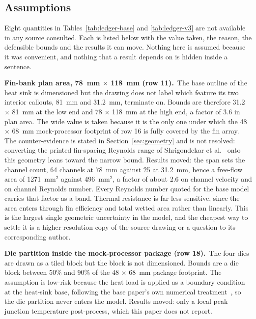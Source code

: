 \subsection{Assumptions}
\label{sec:assumptions}

Eight quantities in Tables~\ref{tab:ledger-base} and \ref{tab:ledger-v3} are not available in any
source consulted. Each is listed below with the value taken, the reason, the defensible bounds and
the results it can move. Nothing here is assumed because it was convenient, and nothing that a
result depends on is hidden inside a sentence.

\noindent\textbf{Fin-bank plan area, 78~mm $\times$ 118~mm (row 11).}\ The base outline of the heat sink is
dimensioned but the drawing does not label which feature its two interior callouts, 81~mm and
31.2~mm, terminate on. Bounds are therefore 31.2 $\times$ 81~mm at the low end and 78 $\times$
118~mm at the high end, a factor of 3.6 in plan area. The wide value is taken because it is the
only one under which the 48 $\times$ 68~mm mock-processor footprint of row 16 is fully covered by
the fin array. The counter-evidence is stated in Section~\ref{sec:geometry} and is not resolved:
converting the printed fin-spacing Reynolds range of Shrigondekar et al.~\cite{shrigondekar2023}
onto this geometry leans toward the narrow bound. Results moved: the span sets the channel count,
64 channels at 78~mm against 25 at 31.2~mm, hence a free-flow area of 1271~mm$^2$ against
496~mm$^2$, a factor of about 2.6 on channel velocity and on channel Reynolds number. Every
Reynolds number quoted for the base model carries that factor as a band. Thermal resistance is far
less sensitive, since the area enters through fin efficiency and total wetted area rather than
linearly. This is the largest single geometric uncertainty in the model, and the cheapest way to
settle it is a higher-resolution copy of the source drawing or a question to its corresponding
author.

\noindent\textbf{Die partition inside the mock-processor package (row 18).}\ The four dies are drawn as a
tiled block but the block is not dimensioned. Bounds are a die block between 50\% and 90\% of the
48 $\times$ 68~mm package footprint. The assumption is low-risk because the heat load is applied as
a boundary condition at the heat-sink base, following the base paper's own numerical
treatment~\cite{muneeshwaran2023}, so the die partition never enters the model. Results moved: only
a local peak junction temperature post-process, which this paper does not report.

